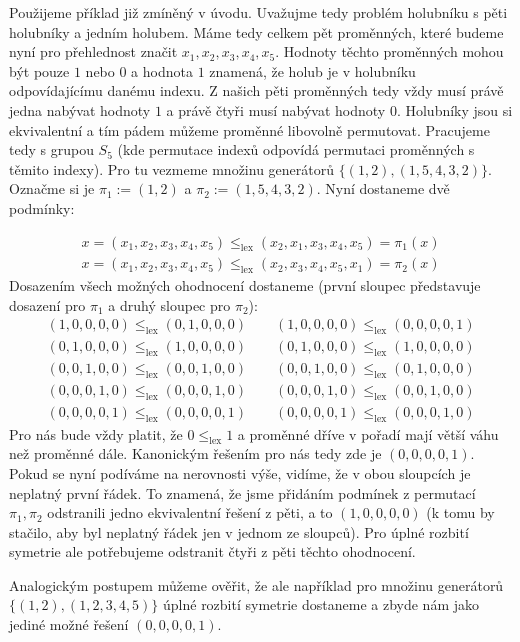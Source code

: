 \begin{prikl}
Použijeme příklad již zmíněný v úvodu. Uvažujme tedy problém holubníku s pěti holubníky a jedním holubem. Máme tedy celkem pět proměnných, které budeme nyní pro přehlednost značit $x_1, x_2, x_3, x_4, x_5$. Hodnoty těchto proměnných mohou být pouze $1$ nebo $0$ a hodnota $1$ znamená, že holub je v holubníku odpovídajícímu danému indexu. Z našich pěti proměnných tedy vždy musí právě jedna nabývat hodnoty $1$ a právě čtyři musí nabývat hodnoty $0$. Holubníky jsou si ekvivalentní a tím pádem můžeme proměnné libovolně permutovat. Pracujeme tedy s grupou $S_5$ (kde permutace indexů odpovídá permutaci proměnných s těmito indexy). Pro tu vezmeme množinu generátorů $\{(1,2),(1,5,4,3,2)\}$. Označme si je $\pi_1 := (1,2)$ a $\pi_2 := (1,5,4,3,2)$. Nyní dostaneme dvě podmínky:

\begin{align*}
x = (x_1, x_2, x_3, x_4, x_5) \leq_{\text{lex}} (x_2, x_1, x_3, x_4, x_5) = \pi_1(x) \\
x = (x_1, x_2, x_3, x_4, x_5) \leq_{\text{lex}} (x_2, x_3, x_4, x_5, x_1) = \pi_2(x)
\end{align*}
Dosazením všech možných ohodnocení dostaneme (první sloupec představuje dosazení pro $\pi_1$ a druhý sloupec pro $\pi_2$):
\begin{align*}
(1,0,0,0,0) \leq_{\text{lex}} (0,1,0,0,0) \qquad (1,0,0,0,0) \leq_{\text{lex}} (0,0,0,0,1) \\
(0,1,0,0,0) \leq_{\text{lex}} (1,0,0,0,0) \qquad (0,1,0,0,0) \leq_{\text{lex}} (1,0,0,0,0) \\
(0,0,1,0,0) \leq_{\text{lex}} (0,0,1,0,0) \qquad (0,0,1,0,0) \leq_{\text{lex}} (0,1,0,0,0) \\
(0,0,0,1,0) \leq_{\text{lex}} (0,0,0,1,0) \qquad (0,0,0,1,0) \leq_{\text{lex}} (0,0,1,0,0) \\
(0,0,0,0,1) \leq_{\text{lex}} (0,0,0,0,1) \qquad (0,0,0,0,1) \leq_{\text{lex}} (0,0,0,1,0)
\end{align*}
Pro nás bude vždy platit, že $0 \leq_{\text{lex}} 1$ a proměnné dříve v pořadí mají větší váhu než proměnné dále. Kanonickým řešením pro nás tedy zde je $(0,0,0,0,1)$. Pokud se nyní podíváme na nerovnosti výše, vidíme, že v obou sloupcích je neplatný první řádek. To znamená, že jsme přidáním podmínek z permutací $\pi_1, \pi_2$ odstranili jedno ekvivalentní řešení z pěti, a to $(1,0,0,0,0)$ (k tomu by stačilo, aby byl neplatný řádek jen v jednom ze sloupců). Pro úplné rozbití symetrie ale potřebujeme odstranit čtyři z pěti těchto ohodnocení.

Analogickým postupem můžeme ověřit, že ale například pro množinu generátorů $\{(1,2),(1,2,3,4,5)\}$ úplné rozbití symetrie dostaneme a zbyde nám jako jediné možné řešení $(0,0,0,0,1)$.
\end{prikl}

